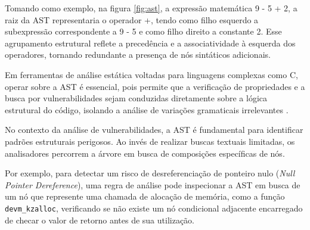 \documentclass[
    12pt,                %
    openright,           %
    oneside,             %
    a4paper,             %
    english,             %
    brazil               %
]{abntex2}
\begin{document}
\begin{itemize}
\par
Tomando como exemplo, na figura \ref{fig:ast}, a expressão matemática 9 - 5 + 2, a raiz da AST representaria o operador +, tendo como filho esquerdo a subexpressão correspondente a 9 - 5 e como filho direito a constante 2.
Esse agrupamento estrutural reflete a precedência e a associatividade à esquerda dos operadores, tornando redundante a presença de nós sintáticos adicionais.
\par
Em ferramentas de análise estática voltadas para linguagens complexas como C, operar sobre a AST é essencial, pois permite que a verificação de propriedades e a busca por vulnerabilidades sejam conduzidas diretamente sobre a lógica estrutural do código, isolando a análise de variações gramaticais irrelevantes \cite{aho2007compilers}.
\par
No contexto da análise de vulnerabilidades, a AST é fundamental para identificar padrões estruturais perigosos.
Ao invés de realizar buscas textuais limitadas, os analisadores percorrem a árvore em busca de composições específicas de nós.
\par
Por exemplo, para detectar um risco de desreferenciação de ponteiro nulo (\textit{Null Pointer Dereference}), uma regra de análise pode inspecionar a AST em busca de um nó que represente uma chamada de alocação de memória, como a função \texttt{devm\_kzalloc}, verificando se não existe um nó condicional adjacente encarregado de checar o valor de retorno antes de sua utilização.


\end{itemize}
\end{document}
